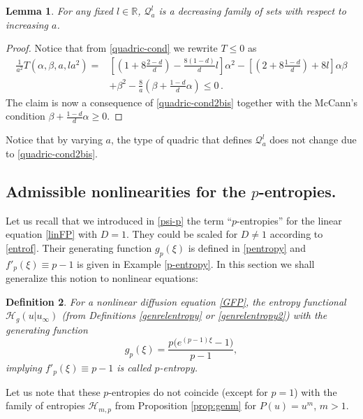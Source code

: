 \documentclass[reqno]{amsart}
\newtheorem{lemma}{Lemma}[section]
\newtheorem{definition}[lemma]{Definition}
\newcommand{\R}{\mathbb{R}}
\renewcommand{\H}{{\mathcal{H}}}
\begin{document}
\begin{lemma}\label{Qldecre}
For any fixed $l\in\R$, $\mathcal{Q}_{a}^l$ is a decreasing family of sets with respect to increasing $a$.
\end{lemma}
\begin{proof}
Notice that from \eqref{quadric-cond} we rewrite $T\leq 0$ as
\begin{align}\label{quadric-cond2bis}
  \frac1{a^2}  T(\alpha,\beta,a,l a^2)=&\left[\left(1+8\frac{2-d}{d}\right) -\frac{8(1-d)}{d} l\right]\alpha^2 - \left[\left(2+8\frac{1-d}{d}\right)+8l\right]  \alpha\beta \nonumber\\
  &+ \beta^2-\frac8{a}\left(\beta+\frac{1-d}{d}\alpha\right)\le0\,.
\end{align}
The claim is now a consequence of \eqref{quadric-cond2bis} together with the McCann's condition $\beta+\frac{1-d}{d}\alpha\ge 0$.
\end{proof}

Notice that by varying $a$, the type of quadric that defines $\mathcal{Q}_{a}^l$ does not change due to \eqref{quadric-cond2bis}.


\subsection{Admissible nonlinearities for the $p$-entropies.}\label{sec:admiss-sets-p}

Let us recall that we introduced in \eqref{psi-p} the term ``$p$-entropies'' for the linear equation \eqref{linFP} with $D=1$. They could be scaled for $D\ne1$ according to \eqref{entrof}. Their generating function $g_p(\xi)$ is defined in \eqref{pentropy} and $f'_p(\xi)\equiv p-1$ is given in Example \ref{p-entropy}. In this section we shall generalize this notion to nonlinear equations:

\begin{definition}\label{def:p-ent}
For a nonlinear diffusion equation \eqref{GFP}, the entropy functional $\H_g(u|u_\infty)$ (from Definitions \ref{genrelentropy} or \ref{genrelentropy2}) with the generating function 
\[
g_p(\xi)=\frac{p\big(e^{(p-1)\xi}-1\big)}{p-1},
\]
implying $f'_p(\xi)\equiv p-1$ is called \emph{$p$-entropy}.
\end{definition}

Let us note that these $p$-entropies do not coincide (except for $p=1$) with the family of entropies $\H_{m,p}$ from Proposition \ref{prop:genm} for $P(u)=u^m$, $m>1$. \\
\end{document}
